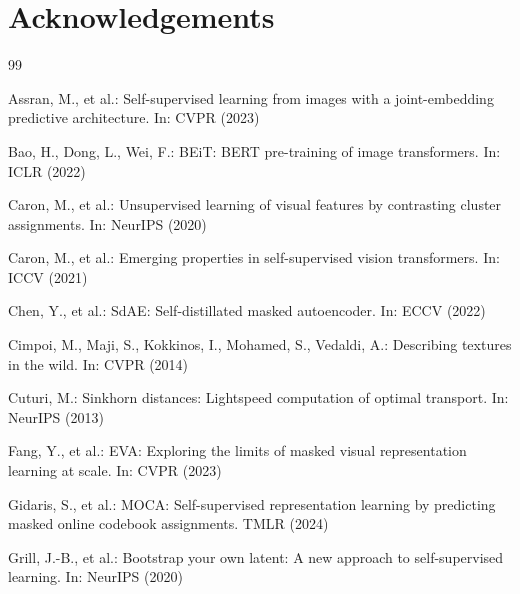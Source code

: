 \documentclass[runningheads]{llncs}
\begin{document}
\section*{Acknowledgements}


%
%

% 
%
\begin{thebibliography}{99}

Assran, M., et al.:
Self-supervised learning from images with a joint-embedding predictive architecture.
In: CVPR (2023)

Bao, H., Dong, L., Wei, F.:
BEiT: BERT pre-training of image transformers.
In: ICLR (2022)

Caron, M., et al.:
Unsupervised learning of visual features by contrasting cluster assignments.
In: NeurIPS (2020)

Caron, M., et al.:
Emerging properties in self-supervised vision transformers.
In: ICCV (2021)

Chen, Y., et al.:
SdAE: Self-distillated masked autoencoder.
In: ECCV (2022)

Cimpoi, M., Maji, S., Kokkinos, I., Mohamed, S., Vedaldi, A.:
Describing textures in the wild.
In: CVPR (2014)

Cuturi, M.:
Sinkhorn distances: Lightspeed computation of optimal transport.
In: NeurIPS (2013)

Fang, Y., et al.:
EVA: Exploring the limits of masked visual representation learning at scale.
In: CVPR (2023)

Gidaris, S., et al.:
MOCA: Self-supervised representation learning by predicting masked online codebook assignments.
TMLR (2024)

Grill, J.-B., et al.:
Bootstrap your own latent: A new approach to self-supervised learning.
In: NeurIPS (2020)


\end{thebibliography}
\end{document}
